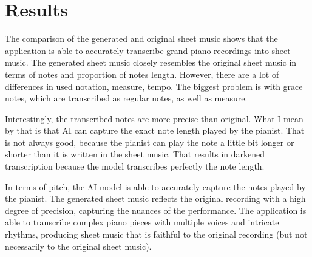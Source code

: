 \documentclass{article}
\begin{document}
\clearpage
\begin{figure}[htbp]
    \centering
    \label{fig:generated_waldstein}
    
\end{figure}

\clearpage
\begin{figure}[htbp]
    \centering
    \label{fig:original_waldstein}
    
\end{figure}

\clearpage
\begin{figure}[htbp]
    \centering
    \label{fig:generated_pathetique}
    
\end{figure}

\clearpage
\begin{figure}[htbp]
    \centering
    \label{fig:original_pathetique}
    
\end{figure}




\FloatBarrier
\clearpage
\section{Results}

The comparison of the generated and original sheet music shows that the application is able to accurately transcribe grand piano recordings into sheet music. The generated sheet music closely resembles the original sheet music in terms of notes and proportion of notes length. However, there are a lot of differences in used notation, measure, tempo. The biggest problem is with grace notes, which are transcribed as regular notes, as well as measure. 

Interestingly, the transcribed notes are more precise than original. What I mean by that is that AI can capture the exact note length played by the pianist. That is not always good, because the pianist can play the note a little bit longer or shorter than it is written in the sheet music. That results in darkened transcription because the model transcribes perfectly the note length.

In terms of pitch, the AI model is able to accurately capture the notes played by the pianist. The generated sheet music reflects the original recording with a high degree of precision, capturing the nuances of the performance. The application is able to transcribe complex piano pieces with multiple voices and intricate rhythms, producing sheet music that is faithful to the original recording (but not necessarily to the original sheet music).
\end{document}
